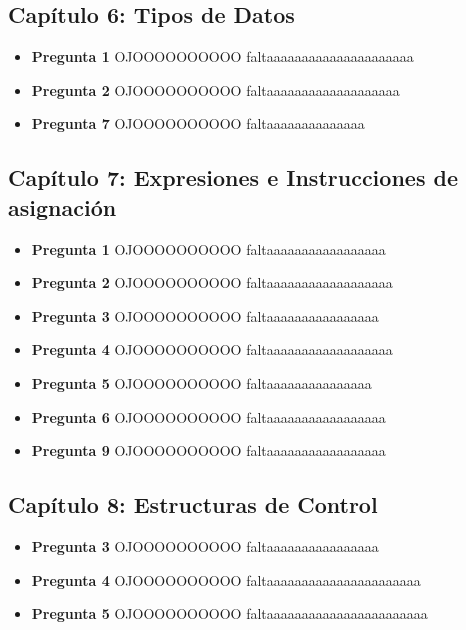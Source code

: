 \documentclass[12pt,oneside]{article}
\begin{document}
		\subsection{Capítulo 6: Tipos de Datos}
			\begin{itemize}
				\item {\bf Pregunta 1}
					OJOOOOOOOOOO faltaaaaaaaaaaaaaaaaaaaaa
				\item {\bf Pregunta 2}
					OJOOOOOOOOOO faltaaaaaaaaaaaaaaaaaaa
				\item {\bf Pregunta 7}
					OJOOOOOOOOOO faltaaaaaaaaaaaaaa
				\end{itemize}

		\subsection{Capítulo 7: Expresiones e Instrucciones de asignación}	
			\begin{itemize}
				\item {\bf Pregunta 1}
					OJOOOOOOOOOO faltaaaaaaaaaaaaaaaaa
				\item {\bf Pregunta 2}
					OJOOOOOOOOOO faltaaaaaaaaaaaaaaaaaa
				\item {\bf Pregunta 3}
					OJOOOOOOOOOO faltaaaaaaaaaaaaaaaa
				\item {\bf Pregunta 4}
					OJOOOOOOOOOO faltaaaaaaaaaaaaaaaaaa
				\item {\bf Pregunta 5}
					OJOOOOOOOOOO faltaaaaaaaaaaaaaaa
				\item {\bf Pregunta 6}
					OJOOOOOOOOOO faltaaaaaaaaaaaaaaaaa
				\item {\bf Pregunta 9}
					OJOOOOOOOOOO faltaaaaaaaaaaaaaaaaa
				\end{itemize}

		\subsection{Capítulo 8: Estructuras de Control}	
			\begin{itemize}
				\item {\bf Pregunta 3}		
					OJOOOOOOOOOO faltaaaaaaaaaaaaaaaa
				\item {\bf Pregunta 4}
					OJOOOOOOOOOO faltaaaaaaaaaaaaaaaaaaaaaa
				\item {\bf Pregunta 5}
					OJOOOOOOOOOO faltaaaaaaaaaaaaaaaaaaaaaaa
			\end{itemize}
\end{document}
